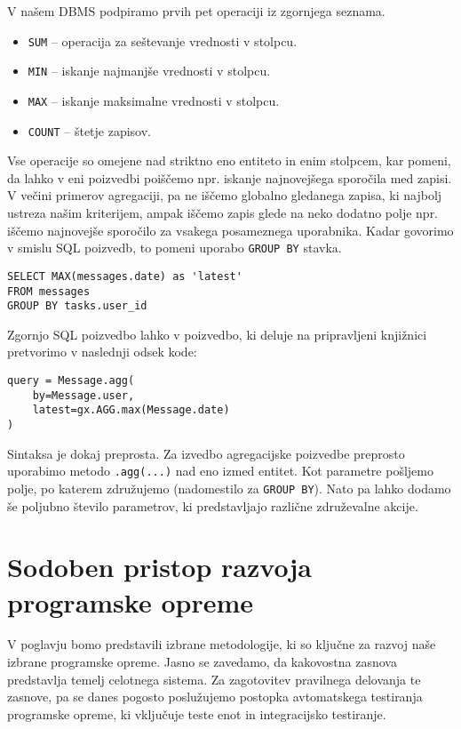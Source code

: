 \documentclass[a4paper,12pt,openright]{book}
\begin{document}
\begin{itemize}
        V našem DBMS podpiramo prvih pet operaciji iz zgornjega seznama.
        
        \begin{itemize}
            \item {\tt SUM} – operacija za seštevanje vrednosti v stolpcu.
            \item {\tt MIN} – iskanje najmanjše vrednosti v stolpcu.
            \item {\tt MAX} – iskanje maksimalne vrednosti v stolpcu.
            \item {\tt COUNT} – štetje zapisov.
        \end{itemize}

        Vse operacije so omejene nad striktno eno entiteto in enim stolpcem, kar pomeni, da lahko v eni poizvedbi poiščemo npr. iskanje najnovejšega sporočila med zapisi. V večini primerov agregaciji, pa ne iščemo globalno gledanega zapisa, ki najbolj ustreza našim kriterijem, ampak iščemo zapis glede na neko dodatno polje npr. iščemo najnovejše sporočilo za vsakega posameznega uporabnika. Kadar govorimo v smislu SQL poizvedb, to pomeni uporabo {\tt GROUP BY} stavka.

\begin{verbatim}
SELECT MAX(messages.date) as 'latest' 
FROM messages
GROUP BY tasks.user_id
\end{verbatim}

        \noindent
        Zgornjo SQL poizvedbo lahko v poizvedbo, ki deluje na pripravljeni knjižnici pretvorimo v naslednji odsek kode:

\begin{verbatim}
query = Message.agg(
    by=Message.user, 
    latest=gx.AGG.max(Message.date)
)
\end{verbatim}

        \noindent
        Sintaksa je dokaj preprosta. Za izvedbo agregacijske poizvedbe preprosto uporabimo metodo {\tt .agg(...)} nad eno izmed entitet. Kot parametre pošljemo polje, po katerem združujemo (nadomestilo za {\tt GROUP BY}). Nato pa lahko dodamo še poljubno število parametrov, ki predstavljajo različne združevalne akcije.
\end{itemize}

\chapter{Sodoben pristop razvoja programske opreme}
\label{ch1}

    V poglavju bomo predstavili izbrane metodologije, ki so ključne za razvoj naše izbrane programske opreme. Jasno se zavedamo, da kakovostna zasnova predstavlja temelj celotnega sistema. Za zagotovitev pravilnega delovanja te zasnove, pa se danes pogosto poslužujemo postopka avtomatskega testiranja programske opreme, ki vključuje teste enot in integracijsko testiranje.
\end{document}
